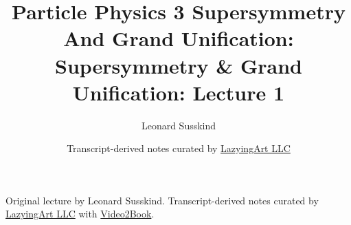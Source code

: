 \documentclass[11pt,oneside]{book}
\begin{document}
\frontmatter
\title{Particle Physics 3 Supersymmetry And Grand Unification: Supersymmetry \& Grand Unification: Lecture 1}
\author{Leonard Susskind}
\date{Transcript-derived notes curated by \href{https://lazying.art}{LazyingArt LLC}}
\maketitle
\begin{center}
\small Original lecture by Leonard Susskind. Transcript-derived notes curated by \href{https://lazying.art}{LazyingArt LLC} with \href{https://github.com/lachlanchen/Video2Book}{Video2Book}.
\end{center}
\clearpage
\mainmatter

\end{document}
